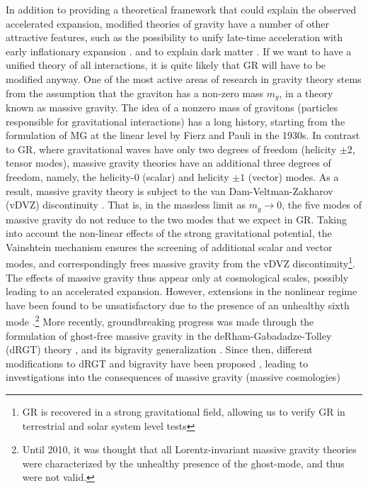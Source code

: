 \documentclass[prd,aps,psfig,nofootinbib,nobibnotes,superscriptaddress,preprintnumbers,times]{revtex4-2}\setlength{\topmargin}{-14mm}
\begin{document}
In addition to providing a theoretical framework that could explain the observed accelerated expansion, modified theories of gravity have a number of other attractive features, such as the possibility to unify late-time acceleration with early inflationary expansion \cite{Hinterbichler:2011tt,Clifton:2011jh,Nojiri:2010wj,Joyce:2014kja}.
and to explain dark matter \cite{Blas:2024jyh, Aoki:2016zgp}. 
If we want to have a unified theory of all interactions, it is quite likely that GR will have to be modified anyway.
One of the most active areas of research in gravity theory stems from the assumption that the graviton has a non-zero mass $m_g$, in a theory known as massive gravity. The idea of a nonzero mass of gravitons (particles responsible for gravitational interactions) has a long history, starting from the formulation of MG at the linear level by Fierz and Pauli \cite{Fierz:1939ix} in the 1930s. In contrast to GR, where gravitational waves have only two degrees of freedom (helicity $\pm 2$, tensor modes), massive gravity theories have an additional three degrees of freedom, namely, the helicity-$0$ (scalar) and helicity $\pm 1$ (vector) modes. As a result, massive gravity theory is subject to the van Dam-Veltman-Zakharov (vDVZ) discontinuity \cite{vanDam:1970vg,Zakharov:1970cc}. That is, in the massless limit as $m_g \rightarrow 0$, the five modes of massive gravity do not reduce to the two modes that we expect in GR. Taking into account the non-linear effects of the strong gravitational potential, the Vainshtein mechanism \cite{Vainshtein:1972sx} ensures the screening of additional scalar and vector modes, and correspondingly frees massive gravity from the vDVZ discontinuity\footnote{GR is recovered in a strong gravitational field, allowing us to verify GR in terrestrial and solar system level tests 
}. The effects of massive gravity thus appear only at
cosmological scales, possibly leading to an accelerated expansion.
However, extensions in the nonlinear regime have been found to be unsatisfactory due to the presence of an unhealthy sixth mode \cite{Boulware:1972yco}.\footnote{Until 2010, it was thought that all Lorentz-invariant massive gravity theories were characterized by the unhealthy presence of the ghost-mode, and thus were not valid. }
More recently, groundbreaking progress was made through the formulation of ghost-free massive gravity in the deRham-Gabadadze-Tolley (dRGT) theory \cite{deRham:2010ik,deRham:2010kj}, and its bigravity generalization \cite{Hassan:2011zd}. Since then, different modifications to dRGT and bigravity have been proposed \cite{Hinterbichler:2011tt,deRham:2014zqa,Koyama:2015vza,deRham:2016nuf,Hinterbichler:2016try, Cusin:2016ytz}, leading to investigations into the consequences of massive gravity (massive cosmologies) 
\end{document}
